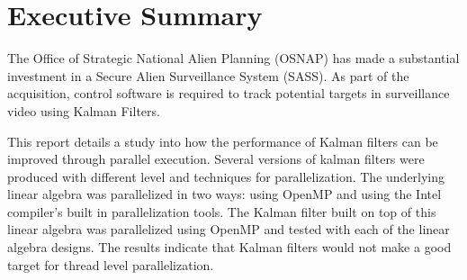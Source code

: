 \section{Executive Summary}
The Office of Strategic National Alien Planning (OSNAP) has made a substantial investment in a Secure Alien Surveillance System (SASS). As part of the acquisition, control software is required to track potential targets in surveillance video using Kalman Filters.

This report details a study into how the performance of Kalman filters can be improved through parallel execution. Several versions of kalman filters were produced with different level and techniques for parallelization. The underlying linear algebra was parallelized in two ways: using OpenMP and using the Intel compiler's built in parallelization tools. The Kalman filter built on top of this linear algebra was parallelized using OpenMP and tested with each of the linear algebra designs. The results indicate that Kalman filters would not make a good target for thread level parallelization.

